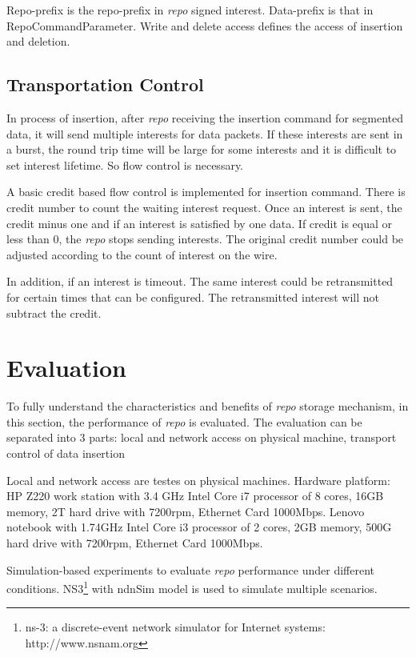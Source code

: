 \documentclass[conference]{IEEEtran}
\begin{document}
Repo-prefix is the repo-prefix in \emph{repo} signed interest. Data-prefix is that in RepoCommandParameter. Write and delete access defines the access of insertion and deletion.

\subsection{Transportation Control}
In process of insertion, after \emph{repo} receiving the insertion command for segmented data, it will send multiple interests for data packets. If these interests are sent in a burst, the round trip time will be large for some interests and it is difficult to set interest lifetime. So flow control is necessary.

A basic credit based flow control is implemented for insertion command. There is credit number to count the waiting interest request. Once an interest is sent, the credit minus one and if an interest is satisfied by one data. If credit is equal or less than 0, the \emph{repo} stops sending interests. The original credit number could be adjusted according to the count of interest on the wire.

In addition, if an interest is timeout. The same interest could be retransmitted for certain times that can be configured. The retransmitted interest will not subtract the credit.

\section{Evaluation} \label{section-evaluation}

To fully understand the characteristics and benefits of \emph{repo} storage mechanism, in this section, the performance of \emph{repo} is evaluated. The evaluation can be separated into 3 parts: local and network access on physical machine, transport control of data insertion

Local and network access are testes on physical machines. Hardware platform: HP Z220 work station with 3.4 GHz Intel Core i7 processor of 8 cores, 16GB memory, 2T hard drive with 7200rpm, Ethernet Card 1000Mbps.  Lenovo notebook with 1.74GHz Intel Core i3 processor of 2 cores, 2GB memory, 500G hard drive with 7200rpm, Ethernet Card 1000Mbps.

Simulation-based experiments to evaluate \emph{repo} performance under different conditions. NS3\footnote{ns-3: a discrete-event network simulator for Internet systems:
http://www.nsnam.org} with ndnSim \cite{afanasyev2012ndnsim} model is used to simulate multiple scenarios.
\end{document}
